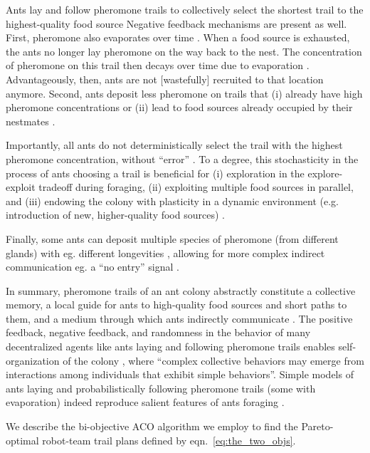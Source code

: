 \documentclass[11pt, oneside]{article}
\begin{document}
\begin{mybox}[label=box:ants, breakable]{Ants lay and follow pheromone trails to collectively select the shortest trail to the highest-quality food source}
Negative feedback mechanisms are present as well. 
First, pheromone also evaporates over time \cite{jackson2006communication}.
When a food source is exhausted, the ants no longer lay pheromone on the way back to the nest. The concentration of pheromone on this trail then decays over time due to evaporation \cite{david2009trail,van2011temperature}. Advantageously, then, ants are not [wastefully] recruited to that location anymore. 
Second, ants deposit less pheromone on trails that (i) already have high pheromone concentrations \cite{czaczkes2013ant} or (ii) lead to food sources already occupied by their nestmates \cite{wendt2020negative}.

Importantly, all ants do not deterministically select the trail with the highest pheromone concentration, without ``error'' \cite{deneubourg1990self}.
To a degree, this stochasticity in the process of ants choosing a trail is beneficial for 
(i) exploration in the explore-exploit tradeoff during foraging, 
(ii) exploiting multiple food sources in parallel, 
and 
(iii) endowing the colony with plasticity in a dynamic environment (e.g. introduction of new, higher-quality food sources) \cite{deneubourg1983probabilistic,shiraishi2019diverse,deneubourg1986random,dussutour2009noise,edelstein1995trail}.

Finally, some ants can deposit multiple species of pheromone (from different glands) with eg. different longevities \cite{czaczkes2015trail}, allowing for more complex indirect communication \cite{jackson2006communication} eg. a ``no entry'' signal \cite{robinson2005no}. 

In summary, pheromone trails of an ant colony abstractly constitute a collective memory, a local guide for ants to high-quality food sources and short paths to them, and a medium through which ants indirectly communicate \cite{jackson2006communication}. 
The positive feedback, negative feedback, and randomness in the behavior of many decentralized agents like ants laying and following pheromone trails enables self-organization of the colony \cite{bonabeau1997self}, where ``complex collective behaviors may emerge from interactions among individuals that exhibit simple behaviors''.
Simple models of ants laying and probabilistically following pheromone trails (some with evaporation) indeed reproduce salient features of ants foraging \cite{bonabeau1999swarm,goss1989self,jackson2006communication,edelstein1995trail,watmough1995modelling}.
\end{mybox}

We describe the bi-objective ACO \cite{iredi2001bi} algorithm we employ to find the Pareto-optimal robot-team trail plans defined by eqn.~\ref{eq:the_two_objs}. 
\end{document}
